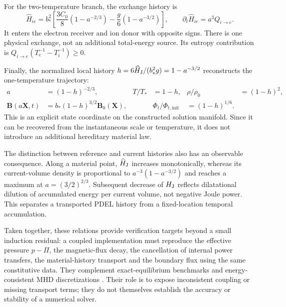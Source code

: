 \documentclass[11pt,a4paper]{article}
\theoremstyle{remark}\newtheorem{remark}{Remark}
\numberwithin{equation}{section}
\newcommand{\BB}{\boldsymbol B}
\newcommand{\XX}{\boldsymbol X}
\begin{document}
For the two-temperature branch, the exchange history is
\begin{equation}
\widehat H_{ie}=b_*^2
\left[\frac{3C_0}{8}(1-a^{-2/3})-\frac g6(1-a^{-3/2})\right],
\qquad \partial_t\widehat H_{ie}=a^3Q_{i\to e}.
\label{eq:exchangehistory}
\end{equation}
It enters the electron receiver and ion donor with opposite signs. There is one physical exchange, not an additional total-energy source. Its entropy contribution is $Q_{i\to e}(T_e^{-1}-T_i^{-1})\ge0$.

Finally, the normalized local history $h=6\widehat H_{\rm J}/(b_*^2g)=1-a^{-3/2}$ reconstructs the one-temperature trajectory:
\begin{equation}
\begin{aligned}
a&=(1-h)^{-2/3},&T/T_*&=1-h,&\rho/\rho_0&=(1-h)^2,\\
\BB(a\XX,t)&=b_*(1-h)^{3/2}\BB_0(\XX),&&
\Phi_t/\Phi_{t,\mathrm{init}}&=(1-h)^{1/6}.
\end{aligned}
\label{eq:historycoordinate}
\end{equation}
This is an explicit state coordinate on the constructed solution manifold. Since it can be recovered from the instantaneous scale or temperature, it does not introduce an additional hereditary material law.

The distinction between reference and current histories also has an observable consequence. Along a material point, $\widehat H_{\rm J}$ increases monotonically, whereas its current-volume density is proportional to $a^{-3}(1-a^{-3/2})$ and reaches a maximum at $a=(3/2)^{2/3}$. Subsequent decrease of $H_{\rm J}$ reflects dilatational dilution of accumulated energy per current volume, not negative Joule power. This separates a transported PDEL history from a fixed-location temporal accumulation.

Taken together, these relations provide verification targets beyond a small induction residual: a coupled implementation must reproduce the effective pressure $p-\Pi$, the magnetic-flux decay, the cancellation of internal power transfers, the material-history transport and the boundary flux using the same constitutive data. They complement exact-equilibrium benchmarks and energy-consistent MHD discretizations \citep{Landreman,Issan,Gawlik2021,Gawlik2025}. Their role is to expose inconsistent coupling or missing transport terms; they do not themselves establish the accuracy or stability of a numerical solver.

\end{document}

